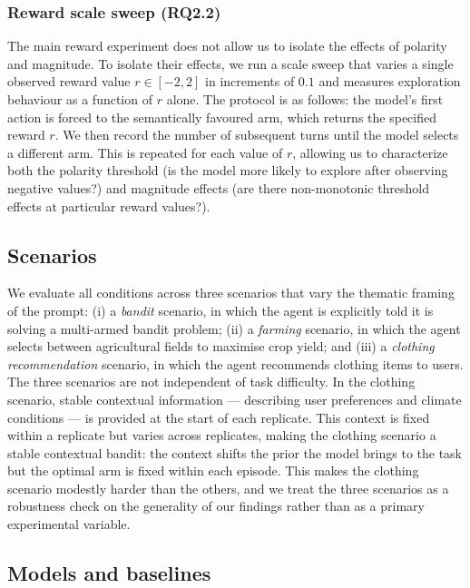 \documentclass{article} %
\begin{document}
\subsubsection{Reward scale sweep (RQ2.2)}
\label{sec:scalesweep_def}
The main reward experiment does not allow us to isolate the effects of polarity and magnitude. To isolate their effects, we run a scale sweep that varies a single observed reward value $r \in [-2, 2]$ in increments of $0.1$ and measures exploration behaviour as a function of $r$ alone. The protocol is as follows: the model's first action is forced to the semantically favoured arm, which returns the specified reward $r$. We then record the number of subsequent turns until the model selects a different arm. This is repeated for each value of $r$, allowing us to characterize both the polarity threshold (is the model more likely to explore after observing negative values?) and magnitude effects (are there non-monotonic threshold effects at particular reward values?). 

\subsection{Scenarios}
\label{sec:scenarios}

We evaluate all conditions across three scenarios that vary the thematic framing of
the prompt: (i) a \textit{bandit} scenario, in which the agent is explicitly told it
is solving a multi-armed bandit problem; (ii) a \textit{farming} scenario, in which
the agent selects between agricultural fields to maximise crop yield; and (iii) a
\textit{clothing recommendation} scenario, in which the agent recommends clothing
items to users. The three scenarios are not independent of task difficulty. In the
clothing scenario, stable contextual information --- describing user preferences and climate conditions --- is provided at the start of each replicate. This context is fixed within a replicate but varies across replicates, making the clothing scenario a stable contextual bandit: the context shifts the prior the model brings to the task but the optimal arm is fixed within each episode. This makes the clothing scenario modestly harder than the others, and we treat the three scenarios as a robustness check on the generality of our findings rather than as a primary experimental variable. 

\subsection{Models and baselines}
\label{sec:models}
\end{document}
